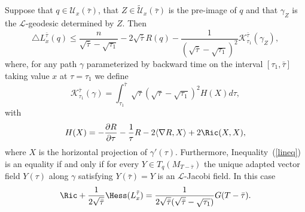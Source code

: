 \begin{proposition}\label{prop:l-length-laplacian-inequality}
\label{triL}
Suppose that $q\in {\mathcal U}_x(\bar\tau)$, that $Z\in \widetilde
{\mathcal U}_x(\bar\tau)$ is the pre-image of $q$ and that
$\gamma_Z$ is the ${\mathcal L}$-geodesic determined by $Z$. Then
\begin{equation}\label{lineq}
 \triangle L_x^{\bar\tau}(q) \leq
\frac{n}{\sqrt{\bar\tau}-\sqrt{\tau_1}} -2\sqrt{\bar\tau}R(q) -
\frac{1}{(\sqrt{\bar\tau}-\sqrt{\tau_1})^2}{\mathcal
K}_{\tau_1}^{\bar\tau}(\gamma_Z),
\end{equation}
where, for any path $\gamma$ parameterized by backward time on the
interval
 $[\tau_1,\bar\tau]$ taking
 value $x$ at $\tau=\tau_1$ we define
$${\mathcal K}_{\tau_1}^{\bar\tau}(\gamma)= \int_{\tau_1}^{\bar\tau}
\sqrt{\tau}(\sqrt{\tau}-\sqrt{\tau_1})^2H(X)d\tau,$$ with
\begin{equation}\label{Hdefnn}
H(X)= -\frac{\partial R}{\partial \tau} - \frac{1}{\tau}R - 2\langle
\nabla R,X\rangle + 2\Ric(X,X), \end{equation} where $X$ is the
horizontal projection of $\gamma'(\tau)$. Furthermore,
Inequality~(\ref{lineq}) is an equality if and only if for every
$Y\in T_q(M_{T-\bar\tau})$ the unique adapted vector field $Y(\tau)$
along $\gamma$ satisfying $Y(\bar\tau)=Y$ is an ${\mathcal
L}$-Jacobi field. In this case
$$\Ric+\frac{1}{2\sqrt{\bar\tau}}\Hess(L_x^{\bar\tau})
=\frac{1}{2\sqrt{\bar\tau}(\sqrt{\bar\tau}-\sqrt{\tau_1})}G(T-\bar\tau).$$
\end{proposition}


